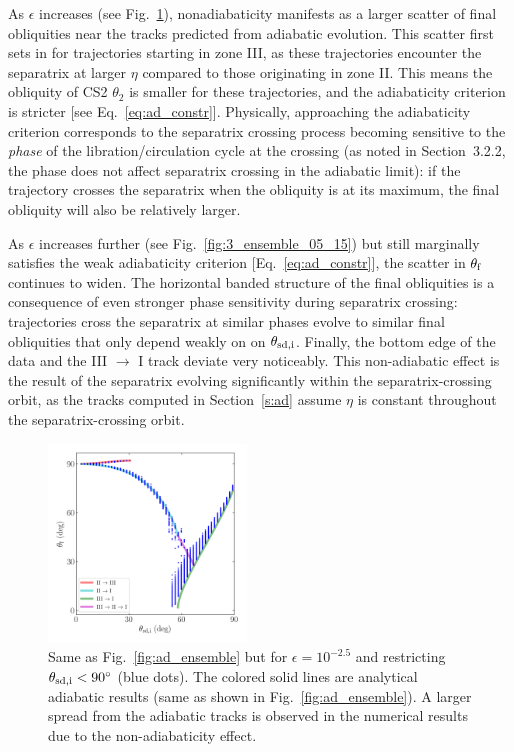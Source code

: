 \documentclass[twocolumn,twocolappendix]{aastex63}
\begin{document}
As $\epsilon$ increases (see Fig.~\ref{fig:3_ensemble_05_25}), nonadiabaticity
manifests as a larger scatter of final obliquities near the tracks predicted
from adiabatic evolution. This scatter first sets in for trajectories starting
in zone III, as these trajectories encounter the separatrix at larger $\eta$
compared to those originating in zone II\@. This means the obliquity of CS2
$\theta_2$ is smaller for these trajectories, and the adiabaticity criterion is
stricter [see Eq.~\eqref{eq:ad_constr}]. Physically, approaching the
adiabaticity criterion corresponds to the separatrix crossing process becoming
sensitive to the \emph{phase} of the libration/circulation cycle at the
crossing \textcolor{Corr}{(as noted in Section~3.2.2, the phase does not affect
separatrix crossing in the adiabatic limit)}: if the trajectory crosses the
separatrix when the obliquity is at its maximum, the final obliquity will also
be relatively larger.

As $\epsilon$ increases further (see Fig.~\ref{fig:3_ensemble_05_15}) but still
marginally satisfies the weak adiabaticity criterion [Eq.~\eqref{eq:ad_constr}],
the scatter in $\theta_{\rm f}$ continues to widen. The horizontal banded
structure of the final obliquities is a consequence of even stronger phase
sensitivity during separatrix crossing: trajectories cross the separatrix at
similar phases evolve to similar final obliquities that only depend weakly on
on $\theta_{\rm sd, i}$. \textcolor{Corr}{Finally, the bottom edge
of the data and the III $\to$ I track deviate very noticeably. This
non-adiabatic effect is the result of the separatrix evolving significantly
within the separatrix-crossing orbit, as the tracks computed in
Section~\ref{s:ad} assume $\eta$ is constant throughout the separatrix-crossing
orbit.}

\begin{figure}
    \centering
    \includegraphics[width=0.47\textwidth]{plots_diskdisp/3_ensemble_05_25.png}
    \caption{Same as Fig.~\ref{fig:ad_ensemble} but for $\epsilon = 10^{-2.5}$
    and restricting $\theta_{\rm sd, i} < 90^\circ$ (blue dots). The colored
    solid lines are analytical adiabatic results (same as shown in
    Fig.~\ref{fig:ad_ensemble}). A larger spread from the adiabatic tracks is
    observed in the numerical results due to the non-adiabaticity effect.
    }\label{fig:3_ensemble_05_25}
\end{figure}
\end{document}
